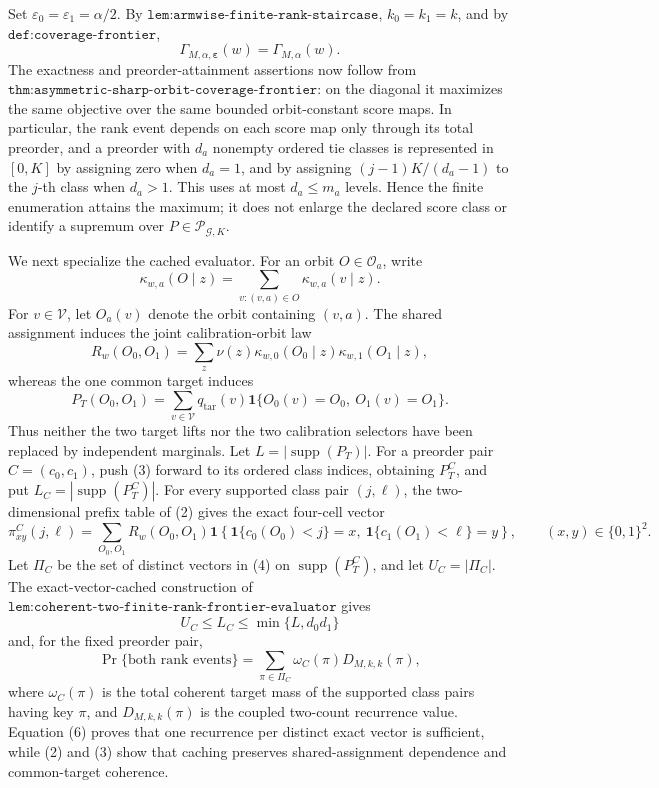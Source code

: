 Set \(\varepsilon_0=\varepsilon_1=\alpha/2\). By \(\texttt{lem:armwise-finite-rank-staircase}\), \(k_0=k_1=k\), and by \(\texttt{def:coverage-frontier}\),
\[
\Gamma_{M,\alpha,\boldsymbol\varepsilon}(w)=\Gamma_{M,\alpha}(w).
\tag{1}
\]
The exactness and preorder-attainment assertions now follow from \(\texttt{thm:asymmetric-sharp-orbit-coverage-frontier}\): on the diagonal it maximizes the same objective over the same bounded orbit-constant score maps. In particular, the rank event depends on each score map only through its total preorder, and a preorder with \(d_a\) nonempty ordered tie classes is represented in \([0,K]\) by assigning zero when \(d_a=1\), and by assigning \((j-1)K/(d_a-1)\) to the \(j\)-th class when \(d_a>1\). This uses at most \(d_a\le m_a\) levels. Hence the finite enumeration attains the maximum; it does not enlarge the declared score class or identify a supremum over \(P\in\mathcal P_{\mathcal G,K}\).

We next specialize the cached evaluator. For an orbit \(O\in\mathcal O_a\), write
\[
\kappa_{w,a}(O\mid z)=\sum_{v:(v,a)\in O}\kappa_{w,a}(v\mid z).
\]
For \(v\in\mathcal V\), let \(O_a(v)\) denote the orbit containing \((v,a)\). The shared assignment induces the joint calibration-orbit law
\[
R_w(O_0,O_1)=\sum_z\nu(z)\kappa_{w,0}(O_0\mid z)\kappa_{w,1}(O_1\mid z),
\tag{2}
\]
whereas the one common target induces
\[
P_T(O_0,O_1)=\sum_{v\in\mathcal V}q_{\mathrm{tar}}(v)\mathbf 1\{O_0(v)=O_0,\ O_1(v)=O_1\}.
\tag{3}
\]
Thus neither the two target lifts nor the two calibration selectors have been replaced by independent marginals. Let \(L=|\operatorname{supp}(P_T)|\). For a preorder pair \(C=(c_0,c_1)\), push (3) forward to its ordered class indices, obtaining \(P_T^C\), and put \(L_C=|\operatorname{supp}(P_T^C)|\). For every supported class pair \((j,\ell)\), the two-dimensional prefix table of (2) gives the exact four-cell vector
\[
\pi^C_{xy}(j,\ell)=\sum_{O_0,O_1}R_w(O_0,O_1)\mathbf 1\!\left\{\mathbf 1\{c_0(O_0)<j\}=x,\ \mathbf 1\{c_1(O_1)<\ell\}=y\right\},
\qquad (x,y)\in\{0,1\}^2.
\tag{4}
\]
Let \(\Pi_C\) be the set of distinct vectors in (4) on \(\operatorname{supp}(P_T^C)\), and let \(U_C=|\Pi_C|\). The exact-vector-cached construction of \(\texttt{lem:coherent-two-finite-rank-frontier-evaluator}\) gives
\[
U_C\le L_C\le\min\{L,d_0d_1\}
\tag{5}
\]
and, for the fixed preorder pair,
\[
\Pr\{\text{both rank events}\}=\sum_{\pi\in\Pi_C}\omega_C(\pi)D_{M,k,k}(\pi),
\tag{6}
\]
where \(\omega_C(\pi)\) is the total coherent target mass of the supported class pairs having key \(\pi\), and \(D_{M,k,k}(\pi)\) is the coupled two-count recurrence value. Equation (6) proves that one recurrence per distinct exact vector is sufficient, while (2) and (3) show that caching preserves shared-assignment dependence and common-target coherence.

